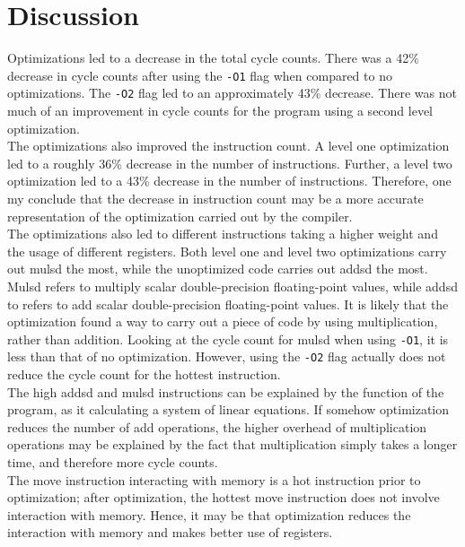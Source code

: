 \documentclass[twocolumn]{article}
\newcommand{\cc}[1]{\texttt{#1}}
\begin{document}
\section{Discussion}

Optimizations led to a decrease in the total cycle counts. There was a 42\% decrease in cycle counts after using the \cc{-O1} flag when compared to no optimizations. The \cc{-O2} flag led to an approximately 43\% decrease. There was not much of an improvement in cycle counts for the program using a second level optimization.\\

The optimizations also improved the instruction count. A level one optimization led to a roughly 36\% decrease in the number of instructions. Further, a level two optimization led to a 43\% decrease in the number of instructions. Therefore, one my conclude that the decrease in instruction count may be a more accurate representation of the optimization carried out by the compiler.\\

The optimizations also led to different instructions taking a higher weight and the usage of different registers. Both level one and level two optimizations carry out mulsd the most, while the unoptimized code carries out addsd the most. Mulsd refers to multiply scalar double-precision floating-point values, while addsd to refers to add scalar double-precision floating-point values. It is likely that the optimization found a way to carry out a piece of code by using multiplication, rather than addition. Looking at the cycle count for mulsd when using \cc{-O1}, it is less than that of no optimization. However, using the \cc{-O2} flag actually does not reduce the cycle count for the hottest instruction. \\

The high addsd and mulsd instructions can be explained by the function of the program, as it calculating a system of linear equations. If somehow optimization reduces the number of add operations, the higher overhead of multiplication operations may be explained by the fact that multiplication simply takes a longer time, and therefore more cycle counts. \\

The move instruction interacting with memory is a hot instruction prior to optimization; after optimization, the hottest move instruction does not involve interaction with memory. Hence, it may be that optimization reduces the interaction with memory and makes better use of registers. \\
\end{document}
